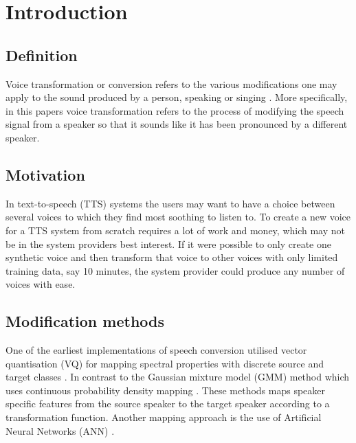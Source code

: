 \chapter{Introduction} %
\label{cha:introduction}


\section{Definition} %
\label{sec:definition}
Voice transformation or conversion refers to the various modifications one may apply to the sound produced by a person, speaking or singing \cite{stylianou08}. More specifically, in this papers voice transformation refers to the process of modifying the speech signal from a speaker so that it sounds like it has been pronounced by a different speaker. 

\section{Motivation} %
\label{sec:motivation}
In text-to-speech (TTS) systems the users may want to have a choice between several voices to which they find most soothing to listen to. To create a new voice for a TTS system from scratch requires a lot of work and money, which may not be in the system providers best interest. If it were possible to only create one synthetic voice and then transform that voice to other voices with only limited training data, say 10 minutes, the system provider could produce any number of voices with ease. 

\section{Modification methods} %
\label{sec:synthesis_methods}
One of the earliest implementations of speech conversion utilised vector quantisation (VQ) for mapping spectral properties with discrete source and target classes \cite{abe88}. In contrast to the Gaussian mixture model (GMM) method which uses continuous probability density mapping \cite{stylianou98}. These methods maps speaker specific features from the source speaker to the target speaker according to a transformation function. Another mapping approach is the use of Artificial Neural Networks (ANN) \cite{desai09}. 


